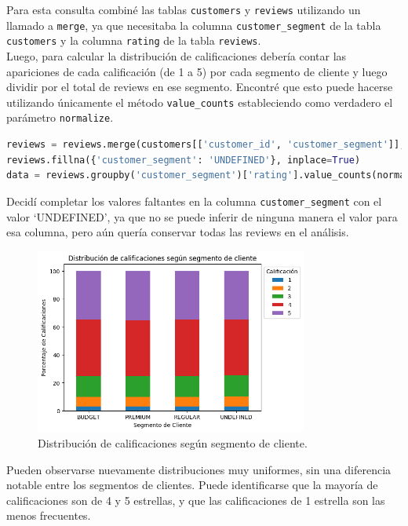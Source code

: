 Para esta consulta combiné las tablas \texttt{customers} y \texttt{reviews} utilizando un llamado a \texttt{merge}, ya que necesitaba la columna \texttt{customer\_segment} de la tabla \texttt{customers} y la columna \texttt{rating} de la tabla \texttt{reviews}. \\
Luego, para calcular la distribución de calificaciones debería contar las apariciones de cada calificación (de 1 a 5) por cada segmento de cliente y luego dividir por el total de reviews en ese segmento. Encontré que esto puede hacerse utilizando únicamente el método \texttt{value\_counts} estableciendo como verdadero el parámetro \texttt{normalize}.
\begin{lstlisting}[language=Python, xleftmargin=20pt, xrightmargin=20pt]
reviews = reviews.merge(customers[['customer_id', 'customer_segment']], on='customer_id', how='left')
reviews.fillna({'customer_segment': 'UNDEFINED'}, inplace=True)
data = reviews.groupby('customer_segment')['rating'].value_counts(normalize=True).unstack()
\end{lstlisting}
Decidí completar los valores faltantes en la columna \texttt{customer\_segment} con el valor `UNDEFINED', ya que no se puede inferir de ninguna manera el valor para esa columna, pero aún quería conservar todas las reviews en el análisis. 

\begin{figure}[H]
    \centering
    \includegraphics[width=0.8\textwidth]{imagenes/consultas_propias/calificaciones_segmentos.png}
    \caption{Distribución de calificaciones según segmento de cliente.}
    \label{fig:distribucion_calificaciones}
\end{figure}

Pueden observarse nuevamente distribuciones muy uniformes, sin una diferencia notable entre los segmentos de clientes. Puede identificarse que la mayoría de calificaciones son de 4 y 5 estrellas, y que las calificaciones de 1 estrella son las menos frecuentes.

